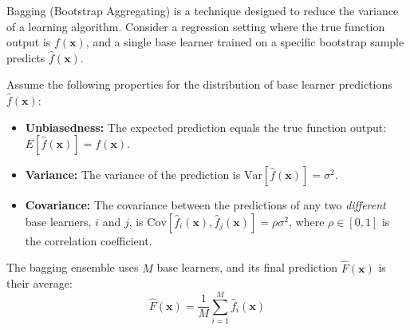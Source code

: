 \documentclass[11pt,addpoints,answers]{exam}
\begin{document}
\begin{questions}

\newpage
\question%

Bagging (Bootstrap Aggregating) is a technique designed to reduce the variance of a learning algorithm. Consider a regression setting where the true function output is $f(\mathbf{x})$, and a single base learner trained on a specific bootstrap sample predicts $\hat{f}(\mathbf{x})$.

Assume the following properties for the distribution of base learner predictions $\hat{f}(\mathbf{x})$:
\begin{itemize}
    \item \textbf{Unbiasedness:} The expected prediction equals the true function output: $E[\hat{f}(\mathbf{x})] = f(\mathbf{x})$.
    \item \textbf{Variance:} The variance of the prediction is $\mathrm{Var}[\hat{f}(\mathbf{x})] = \sigma^2$.
    \item \textbf{Covariance:} The covariance between the predictions of any two \textit{different} base learners, $i$ and $j$, is $\mathrm{Cov}[\hat{f}_i(\mathbf{x}), \hat{f}_j(\mathbf{x})] = \rho \sigma^2$, where $\rho \in [0, 1]$ is the correlation coefficient.
\end{itemize}

The bagging ensemble uses $M$ base learners, and its final prediction $\hat{F}(\mathbf{x})$ is their average:
$$\hat{F}(\mathbf{x}) = \frac{1}{M} \sum_{i=1}^M \hat{f}_i(\mathbf{x})$$


\end{questions}
\end{document}
